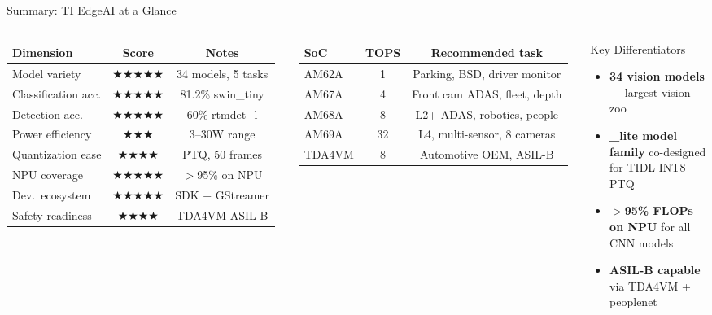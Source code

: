 \documentclass[aspectratio=169]{beamer}
\begin{document}
\begin{frame}{Summary: TI EdgeAI at a Glance}
\begin{columns}
\small
\begin{tabular}{lcc}
\toprule
\textbf{Dimension} & \textbf{Score} & \textbf{Notes}\\
\midrule
Model variety      & $\bigstar\bigstar\bigstar\bigstar\bigstar$ & 34 models, 5 tasks\\
Classification acc.& $\bigstar\bigstar\bigstar\bigstar\bigstar$ & 81.2\% swin\_tiny\\
Detection acc.     & $\bigstar\bigstar\bigstar\bigstar\bigstar$ & 60\% rtmdet\_l\\
Power efficiency   & $\bigstar\bigstar\bigstar$                 & 3--30W range\\
Quantization ease  & $\bigstar\bigstar\bigstar\bigstar$         & PTQ, 50 frames\\
NPU coverage       & $\bigstar\bigstar\bigstar\bigstar\bigstar$ & $>$95\% on NPU\\
Dev.\ ecosystem    & $\bigstar\bigstar\bigstar\bigstar\bigstar$ & SDK + GStreamer\\
Safety readiness   & $\bigstar\bigstar\bigstar\bigstar$         & TDA4VM ASIL-B\\
\bottomrule
\end{tabular}
\vspace{0.2cm}
\footnotesize
\begin{tabular}{lcc}
\toprule
\textbf{SoC} & \textbf{TOPS} & \textbf{Recommended task}\\
\midrule
AM62A  & 1  & Parking, BSD, driver monitor\\
AM67A  & 4  & Front cam ADAS, fleet, depth\\
AM68A  & 8  & L2+ ADAS, robotics, people\\
AM69A  & 32 & L4, multi-sensor, 8 cameras\\
TDA4VM & 8  & Automotive OEM, ASIL-B\\
\bottomrule
\end{tabular}
\begin{block}{Key Differentiators}
\begin{itemize}
  \item \textbf{34 vision models} --- largest vision zoo
  \item \textbf{\_lite model family} co-designed for TIDL INT8 PTQ
  \item \textbf{$>$95\% FLOPs on NPU} for all CNN models
  \item \textbf{ASIL-B capable} via TDA4VM + peoplenet

\end{itemize}
\end{block}
\end{columns}
\end{frame}
\end{document}
